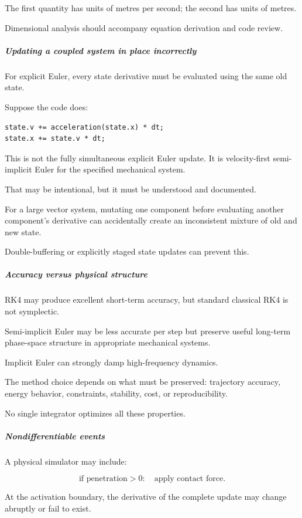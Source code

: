 The first quantity has units of metres per second; the second has units of metres.

Dimensional analysis should accompany equation derivation and code review.

\subparagraph{Updating a coupled system in place incorrectly}\label{updating-a-coupled-system-in-place-incorrectly}

For explicit Euler, every state derivative must be evaluated using the same old state.

Suppose the code does:

\begin{verbatim}
state.v += acceleration(state.x) * dt;
state.x += state.v * dt;
\end{verbatim}

This is not the fully simultaneous explicit Euler update. It is velocity-first semi-implicit Euler for the specified mechanical system.

That may be intentional, but it must be understood and documented.

For a large vector system, mutating one component before evaluating another component's derivative can accidentally create an inconsistent mixture of old and new state.

Double-buffering or explicitly staged state updates can prevent this.

\subparagraph{Accuracy versus physical structure}\label{accuracy-versus-physical-structure}

RK4 may produce excellent short-term accuracy, but standard classical RK4 is not symplectic.

Semi-implicit Euler may be less accurate per step but preserve useful long-term phase-space structure in appropriate mechanical systems.

Implicit Euler can strongly damp high-frequency dynamics.

The method choice depends on what must be preserved: trajectory accuracy, energy behavior, constraints, stability, cost, or reproducibility.

No single integrator optimizes all these properties.

\subparagraph{Nondifferentiable events}\label{nondifferentiable-events}

A physical simulator may include:

\[
\text{if penetration}>0: \quad\text{apply contact force}.
\]

At the activation boundary, the derivative of the complete update may change abruptly or fail to exist.

